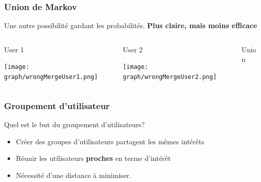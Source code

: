 \documentclass{beamer}
\begin{document}
            \begin{frame}
                \frametitle{Union de Markov}
                Une autre possibilité gardant les probabilités. \pause[5] \textbf{Plus claire, mais moins efficace}
                \pause[2]
                \begin{columns}[t]
                    \begin{column}{3cm}
                        \begin{block}{User 1}
                            \begin{center}
                                \texttt{[image: graph/wrongMergeUser1.png]}
                            \end{center}
                        \end{block}
                    \end{column}
                    \begin{column}{3cm}
                        \begin{block}{User 2}
                            \begin{center}
                                \texttt{[image: graph/wrongMergeUser2.png]}
                            \end{center}
                        \end{block}
                    \end{column}
                    \pause[3]
                    \begin{column}{3cm}
                        \begin{block}{Union}
                            \begin{center}
                                \pause[4]
                            \end{center}
                        \end{block}
                    \end{column}
                \end{columns}
            \end{frame}
            \begin{frame}
                \frametitle{Groupement d'utilisateur}
                Quel est le but du groupement d'utilisateurs?
                \pause
                \begin{itemize}
                    \item Créer des groupes d'utilisateurs partagent les mêmes intérêts
                    \pause
                    \item Réunir les utilisateurs \textbf{proches} en terme d'intérêt
                    \pause
                    \item Nécessité d'une distance à minimiser.
                \end{itemize}
            \end{frame}
\end{document}
